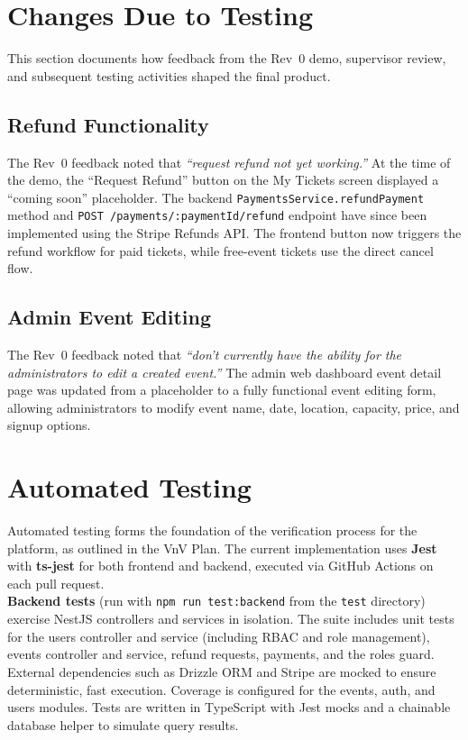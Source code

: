 \documentclass[12pt, titlepage]{article}
\begin{document}
\section{Changes Due to Testing}

This section documents how feedback from the Rev~0 demo, supervisor review, and subsequent testing activities shaped the final product.

\subsection{Refund Functionality}

The Rev~0 feedback noted that \textit{``request refund not yet working.''}  At the time of the demo, the ``Request Refund'' button on the My Tickets screen displayed a ``coming soon'' placeholder.  The backend \texttt{PaymentsService.refundPayment} method and \texttt{POST /payments/:paymentId/refund} endpoint have since been implemented using the Stripe Refunds API.  The frontend button now triggers the refund workflow for paid tickets, while free-event tickets use the direct cancel flow.

\subsection{Admin Event Editing}

The Rev~0 feedback noted that \textit{``don't currently have the ability for the administrators to edit a created event.''} The admin web dashboard event detail page was updated from a placeholder to a fully functional event editing form, allowing administrators to modify event name, date, location, capacity, price, and signup options.


\section{Automated Testing}
Automated testing forms the foundation of the verification process for the platform, as outlined in the VnV Plan.
The current implementation uses \textbf{Jest} with \textbf{ts-jest} for both frontend and backend, executed via GitHub Actions on each pull request.\\

\textbf{Backend tests} (run with \texttt{npm run test:backend} from the \texttt{test} directory) exercise NestJS controllers and services in isolation.
The suite includes unit tests for the users controller and service (including RBAC and role management), events controller and service, refund requests,
payments, and the roles guard. External dependencies such as Drizzle ORM and Stripe are mocked to ensure deterministic, fast execution. Coverage is
configured for the events, auth, and users modules. Tests are written in TypeScript with Jest mocks and a chainable database helper to simulate query results.\\
\end{document}
